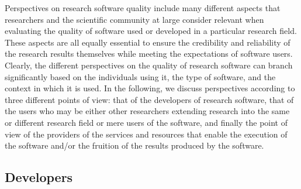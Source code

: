 Perspectives on research software quality include many different aspects that researchers and the scientific community at large consider relevant when evaluating the quality of software used or developed in a particular research field. These aspects are all equally essential to ensure the credibility and reliability of the research results themselves while meeting the expectations of software users. Clearly, the different perspectives on the quality of research software can branch significantly based on the individuals using it, the type of software, and the context in which it is used. 
In the following, we discuss perspectives according to three different points of view: that of the developers of research software, that of the users who may be either other researchers extending research into the same or different research field or mere users of the software, and finally the point of view of the providers of the services and resources that enable the execution of the software and/or the fruition of the results produced by the software.  

\subsection{Developers}

